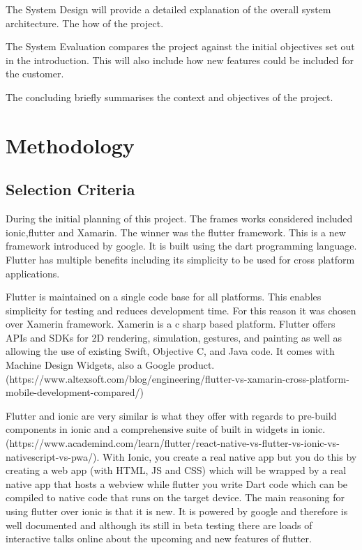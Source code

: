 The System Design will provide a detailed explanation of the overall system architecture. The how of the project.

The System Evaluation compares the project against the initial objectives set out in the introduction. This will also include how new features could be included for the customer.

The concluding briefly summarises the context and objectives of the project.

\chapter{Methodology}

\section{Selection Criteria}

During the initial planning of this project. The frames works considered included ionic,flutter and Xamarin. The winner was the flutter framework. This is a new framework introduced by google. It is built using the dart programming language. Flutter has multiple benefits including its simplicity to be used for cross platform applications.

Flutter is maintained on a single code base for all platforms. This enables simplicity for testing and reduces development time. For this reason it was chosen over Xamerin framework. Xamerin is a c sharp based platform. Flutter offers APIs and SDKs for 2D rendering, simulation, gestures, and painting as well as allowing the use of existing Swift, Objective C, and Java code. It comes with Machine Design Widgets, also a Google product. (https://www.altexsoft.com/blog/engineering/flutter-vs-xamarin-cross-platform-mobile-development-compared/)

Flutter and ionic are very similar is what they offer with regards to pre-build components in ionic and a comprehensive suite of built in widgets in ionic.(https://www.academind.com/learn/flutter/react-native-vs-flutter-vs-ionic-vs-nativescript-vs-pwa/). With Ionic, you create a real native app but you do this by creating a web app (with HTML, JS and CSS) which will be wrapped by a real native app that hosts a webview while flutter you write Dart code which can be compiled to native code that runs on the target device. The main reasoning for using flutter over ionic is that it is new. It is powered by google and therefore is well documented and although its still in beta testing there are loads of interactive talks online about the upcoming and new features of flutter. 


